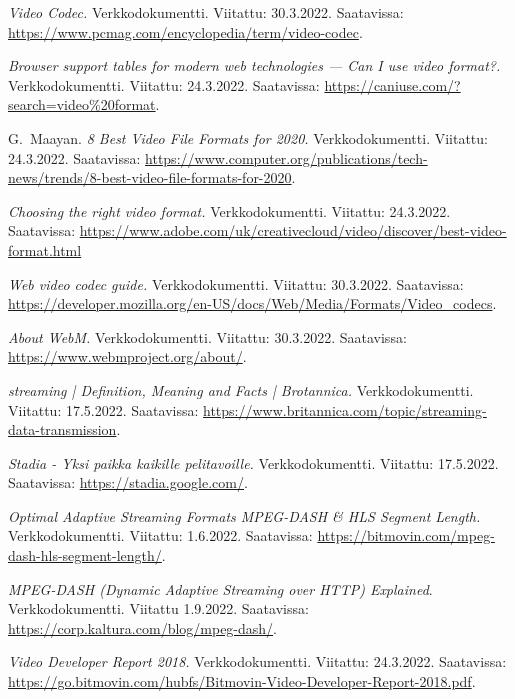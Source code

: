 \documentclass[finnish, 12pt, a4paper, elec, utf8, a-1b, online]{aaltothesis}
\begin{document}
\begin{thebibliography}{99}
    \textit{Video Codec.}
    Verkkodokumentti.
    Viitattu: 30.3.2022.
    Saatavissa: \url{https://www.pcmag.com/encyclopedia/term/video-codec}.

    \textit{Browser support tables for modern web technologies — Can I use video format?.}
    Verkkodokumentti.
    Viitattu: 24.3.2022.
    Saatavissa: \url{https://caniuse.com/?search=video%20format}.

    G.\ Maayan.
    \textit{8 Best Video File Formats for 2020.}
    Verkkodokumentti.
    Viitattu: 24.3.2022.
    Saatavissa: \url{https://www.computer.org/publications/tech-news/trends/8-best-video-file-formats-for-2020}.

    \textit{Choosing the right video format.}
    Verkkodokumentti.
    Viitattu: 24.3.2022.
    Saatavissa: \url{https://www.adobe.com/uk/creativecloud/video/discover/best-video-format.html}

    \textit{Web video codec guide.}
    Verkkodokumentti.
    Viitattu: 30.3.2022.
    Saatavissa: \url{https://developer.mozilla.org/en-US/docs/Web/Media/Formats/Video_codecs}.

    \textit{About WebM.}
    Verkkodokumentti.
    Viitattu: 30.3.2022.
    Saatavissa: \url{https://www.webmproject.org/about/}.

    \textit{streaming | Definition, Meaning and Facts | Brotannica.}
    Verkkodokumentti.
    Viitattu: 17.5.2022.
    Saatavissa: \url{https://www.britannica.com/topic/streaming-data-transmission}.

    \textit{Stadia - Yksi paikka kaikille pelitavoille.}
    Verkkodokumentti.
    Viitattu: 17.5.2022.
    Saatavissa: \url{https://stadia.google.com/}.

    \textit{Optimal Adaptive Streaming Formats MPEG-DASH & HLS Segment Length.}
    Verkkodokumentti.
    Viitattu: 1.6.2022.
    Saatavissa: \url{https://bitmovin.com/mpeg-dash-hls-segment-length/}.

    \textit{MPEG-DASH (Dynamic Adaptive Streaming over HTTP) Explained}.
    Verkkodokumentti.
    Viitattu 1.9.2022.
    Saatavissa: \url{https://corp.kaltura.com/blog/mpeg-dash/}.

    \textit{Video Developer Report 2018.}
    Verkkodokumentti.
    Viitattu: 24.3.2022.
    Saatavissa: \url{https://go.bitmovin.com/hubfs/Bitmovin-Video-Developer-Report-2018.pdf}.


\end{thebibliography}
\end{document}
